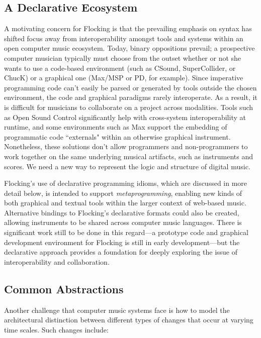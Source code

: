 \documentclass{article}
\begin{document}
\subsection{A Declarative Ecosystem}

A motivating concern for Flocking is that the prevailing emphasis on syntax has shifted focus away from interoperability amongst tools and systems within an open computer music ecosystem. Today, binary oppositions prevail; a prospective computer musician typically must choose from the outset whether or not she wants to use a code-based environment (such as CSound, SuperCollider, or ChucK) or a graphical one (Max/MSP or PD, for example). Since imperative programming code can't easily be parsed or generated by tools outside the chosen environment, the code and graphical paradigms rarely interoperate. As a result, it is difficult for musicians to collaborate on a project across modalities. Tools such as Open Sound Control \cite{wright1997open} significantly help with cross-system interoperability at runtime, and some environments such as Max support the embedding of programmatic code ``externals" within an otherwise graphical instrument. Nonetheless, these solutions don't allow programmers and non-programmers to work together on the same underlying musical artifacts, such as instruments and scores. We need a new way to represent the logic and structure of digital music.

Flocking's use of declarative programming idioms, which are discussed in more detail below, is intended to support {\it metaprogramming}, enabling new kinds of both graphical and textual tools within the larger context of web-based music. Alternative bindings to Flocking's declarative formats could also be created, allowing instruments to be shared across computer music languages. There is significant work still to be done in this regard---a prototype code and graphical development environment for Flocking is still in early development---but the declarative approach provides a foundation for deeply exploring the issue of interoperability and collaboration.

\subsection{Common Abstractions}

Another challenge that computer music systems face is how to model the architectural distinction between different types of changes that occur at varying time scales. Such changes include:
\end{document}
